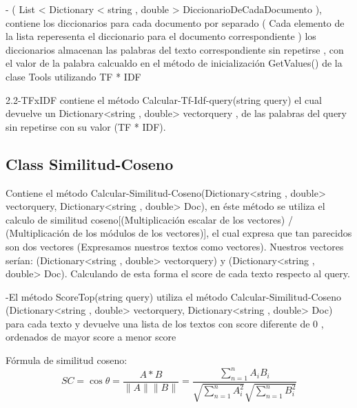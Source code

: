 \documentclass[a4paper,12pt]{article}
\begin{document}
    \vspace{1cm}

    - ( List < Dictionary < string , double > DiccionarioDeCadaDocumento ),
    contiene los diccionarios para cada documento por separado ( Cada elemento de la lista reperesenta el diccionario para el documento correspondiente ) los diccionarios almacenan las palabras del texto correspondiente sin repetirse , con el valor de la palabra calcualdo en el método de inicialización GetValues() de la clase Tools utilizando TF * IDF

    \vspace{1cm}
    2.2-TFxIDF contiene el método Calcular-Tf-Idf-query(string query) el cual devuelve un Dictionary<string , double> vectorquery , de las palabras del query sin repetirse con su valor (TF * IDF).

    \subsection{Class Similitud-Coseno}\label{sub:Similitud-Coseno}

    Contiene el método Calcular-Similitud-Coseno(Dictionary<string , double> vectorquery, Dictionary<string , double> Doc), en éste método se utiliza el calculo de similitud coseno[(Multiplicación escalar de los vectores) / (Multiplicación de los módulos de los vectores)], el cual expresa que tan parecidos son dos vectores
    (Expresamos nuestros textos como vectores). Nuestros vectores serían:
    (Dictionary<string , double> vectorquery) y (Dictionary<string , double> Doc). Calculando de esta forma el score de cada texto respecto al query.

    \vspace{1cm}

    -El método ScoreTop(string query) utiliza el método Calcular-Similitud-Coseno (Dictionary<string , double> vectorquery, Dictionary<string , double> Doc) para cada texto y devuelve una lista de los textos con score diferente de 0 , ordenados de mayor score a menor score

    \vspace{1cm}
    Fórmula de similitud coseno:
    \begin{equation}
        SC = \cos \theta = \frac{A * B}{\parallel A \parallel \parallel B \parallel} = \frac{\sum_{n = 1}^{n} A_i B_i  }{\sqrt{\sum_{n = 1}^{n} A^2_i} \sqrt{\sum_{n = 1}^{n} B^2_i} }
    \end{equation}

    \newpage
\end{document}
